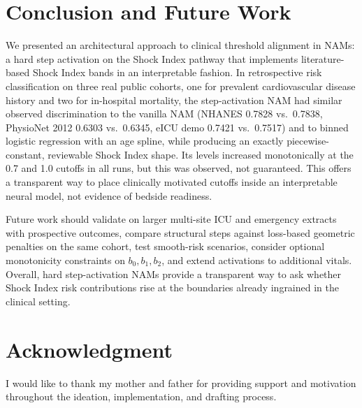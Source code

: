 \documentclass[conference]{IEEEtran}
\begin{document}
\section{Conclusion and Future Work}
We presented an architectural approach to clinical threshold alignment in NAMs: a hard step activation on the Shock Index pathway that implements literature-based Shock Index bands in an interpretable fashion. In retrospective risk classification on three real public cohorts, one for prevalent cardiovascular disease history and two for in-hospital mortality, the step-activation NAM had similar observed discrimination to the vanilla NAM (NHANES 0.7828 vs.\ 0.7838, PhysioNet 2012 0.6303 vs.\ 0.6345, eICU demo 0.7421 vs.\ 0.7517) and to binned logistic regression with an age spline, while producing an exactly piecewise-constant, reviewable Shock Index shape. Its levels increased monotonically at the 0.7 and 1.0 cutoffs in all runs, but this was observed, not guaranteed. This offers a transparent way to place clinically motivated cutoffs inside an interpretable neural model, not evidence of bedside readiness.

Future work should validate on larger multi-site ICU and emergency extracts with prospective outcomes, compare structural steps against loss-based geometric penalties on the same cohort, test smooth-risk scenarios, consider optional monotonicity constraints on $b_0,b_1,b_2$, and extend activations to additional vitals. Overall, hard step-activation NAMs provide a transparent way to ask whether Shock Index risk contributions rise at the boundaries already ingrained in the clinical setting.

\section*{Acknowledgment}
I would like to thank my mother and father for providing support and motivation throughout the ideation, implementation, and drafting process.
\end{document}
